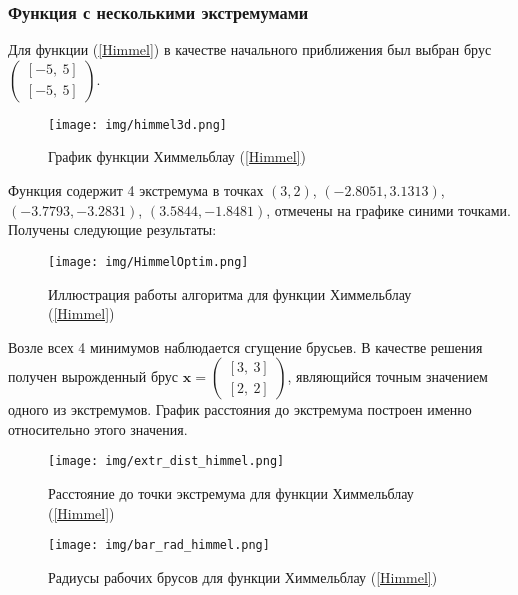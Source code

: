 \documentclass[a4paper]{article}
\begin{document}
\subsubsection{Функция с несколькими экстремумами}
Для функции (\ref{Himmel}) в качестве начального приближения был выбран брус $\begin{pmatrix}
[-5,\: 5]\\
[-5,\: 5]
\end{pmatrix}$.
\begin{figure}[H]
    \centering
    \texttt{[image: img/himmel3d.png]}
    \caption{График функции Химмельблау (\ref{Himmel})}
    \label{fig:himmel}
\end{figure}
Функция содержит 4 экстремума в точках $(3, 2)$, $(-2.8051, 3.1313)$, $(-3.7793, -3.2831)$, $(3.5844, -1.8481)$, отмечены на графике синими точками. Получены следующие результаты:
\begin{figure}[H]
    \centering
    \texttt{[image: img/HimmelOptim.png]}
    \caption{Иллюстрация работы алгоритма для функции Химмельблау (\ref{Himmel})}
    \label{fig:himOpt}
\end{figure}
Возле всех 4 минимумов наблюдается сгущение брусьев. В качестве решения получен вырожденный брус $\mathbf{x}=\begin{pmatrix}
[   3,\:    3]\\ 
[   2,\:   2]
\end{pmatrix}$, являющийся точным значением одного из экстремумов. График расстояния до экстремума построен именно относительно этого значения.
\begin{figure}[H]
    \centering
    \texttt{[image: img/extr\_dist\_himmel.png]}
    \caption{Расстояние до точки экстремума для функции Химмельблау (\ref{Himmel})}
    \label{fig:himExtr}
\end{figure}
\begin{figure}[H]
    \centering
    \texttt{[image: img/bar\_rad\_himmel.png]}
    \caption{Радиусы рабочих брусов для функции Химмельблау (\ref{Himmel})}
    \label{fig:radHimmel}
\end{figure}
\end{document}
